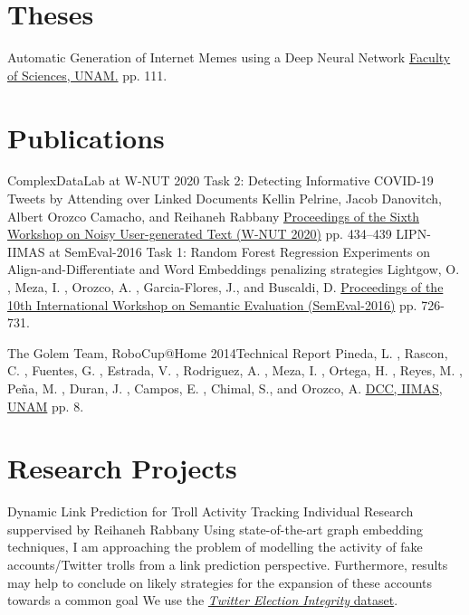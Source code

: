 \documentclass[8pt,a4paper,sans]{moderncv} %
\begin{document}
\section{Theses}

        {Automatic Generation of Internet Memes using a Deep Neural Network}
        {}{}{}
        {\href{http://132.248.9.195/ptd2018/febrero/0770173/}{Faculty of Sciences, UNAM.} pp. 111.}

\newpage

\section{Publications}

        {ComplexDataLab at W-NUT 2020 Task 2: Detecting Informative COVID-19 Tweets by Attending over Linked Documents}
        {}{}{}
        {Kellin Pelrine, Jacob Danovitch, Albert Orozco Camacho, and Reihaneh Rabbany
         \href{https://www.aclweb.org/anthology/2020.wnut-1.63}{Proceedings of the Sixth Workshop on Noisy User-generated Text (W-NUT 2020)} pp. 434–439}
        {LIPN-IIMAS at SemEval-2016 Task 1: Random Forest Regression Experiments on Align-and-Differentiate and Word Embeddings penalizing strategies}
        {}{}{}
        {Lightgow, O. , Meza, I. , Orozco, A. , Garcia-Flores, J., and Buscaldi, D.
         \href{https://www.aclweb.org/anthology/S/S16/S16-1112.pdf}{Proceedings of the 10th International Workshop on Semantic Evaluation (SemEval-2016)} pp. 726-731.}

        {The Golem Team, RoboCup@Home 2014}{Technical Report}
        {}{}
        {Pineda, L. , Rascon, C. , Fuentes, G. , Estrada, V. , Rodriguez, A. , Meza, I. , Ortega, H. ,
         Reyes, M. , Peña, M. , Duran, J. , Campos, E. , Chimal, S., and Orozco, A.
         \href{http://golem.iimas.unam.mx/pubs/tdp_Golem-II+_2014.pdf}{DCC, IIMAS, UNAM} pp. 8.}

\section{Research Projects}


        {Dynamic Link Prediction for Troll Activity Tracking}
        {Individual Research}
        {suppervised by Reihaneh Rabbany}
        {Using state-of-the-art graph embedding techniques, I am approaching the problem
          of modelling the activity of fake accounts/Twitter trolls from a link prediction
          perspective. Furthermore, results may help to conclude on likely strategies for
          the expansion of these accounts towards a common goal}
        {We use the \href{https://transparency.twitter.com/en/reports/information-operations.html}{\emph{Twitter Election Integrity} dataset}.}
        
\end{document}

